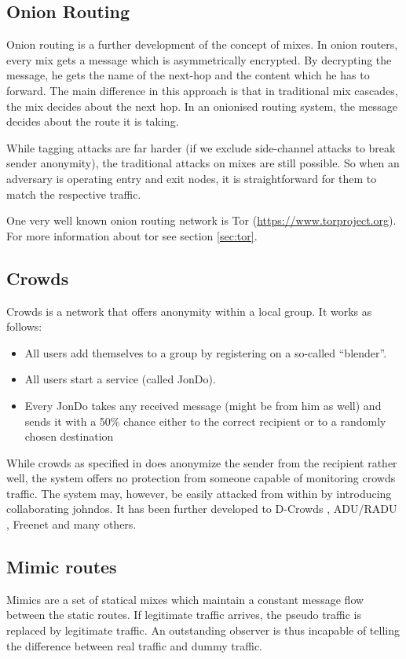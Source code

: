 \subsection{Onion Routing}
Onion routing is a further development of the concept of mixes. In onion routers, every mix gets a message which is asymmetrically encrypted. By decrypting the message, he gets the name of the next-hop and the content which he has to forward. The main difference in this approach is that in traditional mix cascades, the mix decides about the next hop. In an onionised routing system, the message decides about the route it is taking. 

While tagging attacks are far harder (if we exclude side-channel attacks to break sender anonymity), the traditional attacks on mixes are still possible. So when an adversary is operating entry and exit nodes, it is straightforward for them to match the respective traffic.

One very well known onion routing network is Tor (\href{https://www.torproject.org}{https://www.torproject.org}). For more information about tor see section \ref{sec:tor}.

\subsection{Crowds}

Crowds is a network that offers anonymity within a local group. It works as follows:

\begin{itemize}
	\item All users add themselves to a group by registering on a so-called ``blender''.
	\item All users start a service (called JonDo).
	\item Every JonDo takes any received message (might be from him as well) and sends it with a 50\% chance either to the correct recipient or to a randomly chosen destination
\end{itemize}

While crowds as specified in \cite{crowds:tissec} does anonymize the sender from the recipient rather well, the system offers no protection from someone capable of monitoring crowds traffic. The system may, however, be easily attacked from within by introducing collaborating johndos. It has been further developed to D-Crowds \cite{DBLP:conf/esorics/DanezisDKT09}, ADU/RADU \cite{Munoz-Gea2008}, Freenet\cite{freenet} and many others. 

\subsection{Mimic routes}
Mimics are a set of statical mixes which maintain a constant message flow between the static routes. If legitimate traffic arrives, the pseudo traffic is replaced by legitimate traffic. An outstanding observer is thus incapable of telling the difference between real traffic and dummy traffic.

